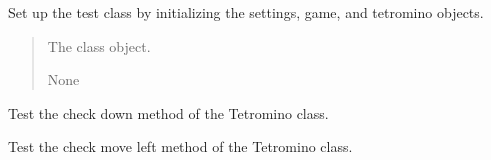 \documentclass[letterpaper,10pt,english]{sphinxmanual}
\begin{document}
\begin{fulllineitems}

\begin{fulllineitems}
\label{\detokenize{tetris.tests.test_tetrominos:tetris.tests.test_tetrominos.TestTetromino.setUpClass}}
\pysigstartsignatures
{}
\pysigstopsignatures
\sphinxAtStartPar
Set up the test class by initializing the settings, game, and tetromino objects.
\begin{quote}\begin{description}
\sphinxAtStartPar
{} \textendash{} The class object.

\sphinxAtStartPar
None

\end{description}\end{quote}

\end{fulllineitems}


\begin{fulllineitems}
\label{\detokenize{tetris.tests.test_tetrominos:tetris.tests.test_tetrominos.TestTetromino.test_check_down}}
\pysigstartsignatures
{}
\pysigstopsignatures
\sphinxAtStartPar
Test the check down method of the Tetromino class.

\end{fulllineitems}


\begin{fulllineitems}
\label{\detokenize{tetris.tests.test_tetrominos:tetris.tests.test_tetrominos.TestTetromino.test_check_move_left}}
\pysigstartsignatures
{}
\pysigstopsignatures
\sphinxAtStartPar
Test the check move left method of the Tetromino class.


\end{fulllineitems}
\end{fulllineitems}
\end{document}
